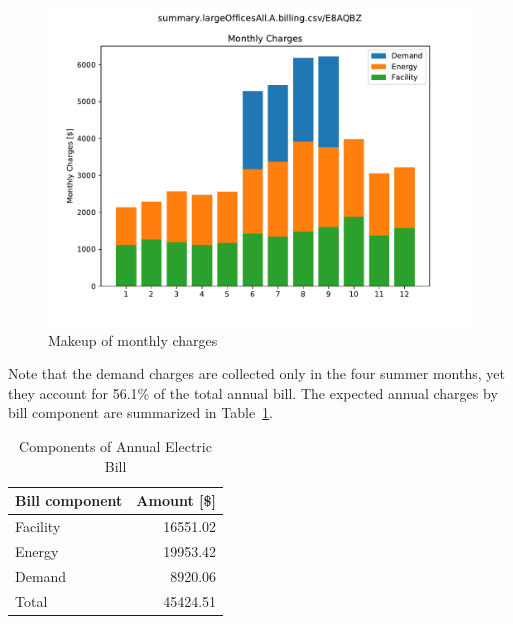 \documentclass[11pt]{article}
\begin{document}
\begin{figure}[!h]
\centering
\includegraphics[width=\columnwidth, page=1, trim=0in 0.45in 0in 0.45in, clip]{visuals/E8AQBZ.boxplot.pdf}
\caption{Makeup of monthly charges}
\label{fig:bars}
\end{figure}

Note that the demand charges are collected only in the four summer months, yet they account for 56.1\% of the total annual bill. The expected annual charges by bill component are summarized in Table~\ref{tab:annual}.

\begin{table}[th!]
  \centering
  \caption{Components of Annual Electric Bill}
  \vspace{1.5ex}
  \label{tab:annual}
  \begin{tabular}{lr}
    Bill component & Amount [\$] \\
    \midrule
    Facility & 16551.02 \\
    Energy & 19953.42 \\
    Demand & 8920.06 \\
    \midrule
    Total & 45424.51
  \end{tabular}
\end{table}
\clearpage

\pagestyle{energy}
\end{document}
